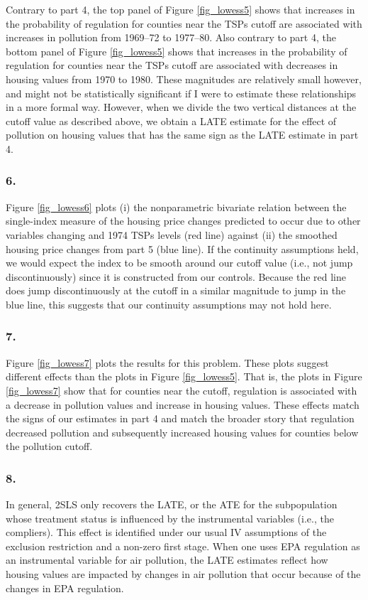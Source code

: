 \documentclass[12pt]{article}
\begin{document}
Contrary to part 4, the top panel of Figure \ref{fig_lowess5} shows that increases in the probability of regulation for counties near the TSPs cutoff are associated with increases in pollution from 1969--72 to 1977--80. Also contrary to part 4, the bottom panel of Figure \ref{fig_lowess5} shows that increases in the probability of regulation for counties near the TSPs cutoff are associated with decreases in housing values from 1970 to 1980. These magnitudes are relatively small however, and might not be statistically significant if I were to estimate these relationships in a more formal way. However, when we divide the two vertical distances at the cutoff value as described above, we obtain a LATE estimate for the effect of pollution on housing values that has the same sign as the LATE estimate in part 4.


\subsubsection*{6.}
Figure \ref{fig_lowess6} plots (i) the nonparametric bivariate relation between the single-index measure of the housing price changes predicted to occur due to other variables changing and 1974 TSPs levels (red line) against (ii) the smoothed housing price changes from part 5 (blue line). If the continuity assumptions held, we would expect the index to be smooth around our cutoff value (i.e., not jump discontinuously) since it is constructed from our controls. Because the red line does jump discontinuously at the cutoff in a similar magnitude to jump in the blue line, this suggests that our continuity assumptions may not hold here.

\subsubsection*{7.}
Figure \ref{fig_lowess7} plots the results for this problem. These plots suggest different effects than the plots in Figure \ref{fig_lowess5}. That is, the plots in Figure \ref{fig_lowess7} show that for counties near the cutoff, regulation is associated with a decrease in pollution values and increase in housing values. These effects match the signs of our estimates in part 4 and match the broader story that regulation decreased pollution and subsequently increased housing values for counties below the pollution cutoff.

\subsubsection*{8.}
In general, 2SLS only recovers the LATE, or the ATE for the subpopulation whose treatment status is influenced by the instrumental variables (i.e., the compliers). This effect is identified under our usual IV assumptions of the exclusion restriction and a non-zero first stage. When one uses EPA regulation as an instrumental variable for air pollution, the LATE estimates reflect how housing values are impacted by changes in air pollution that occur because of the changes in EPA regulation. 
\end{document}
